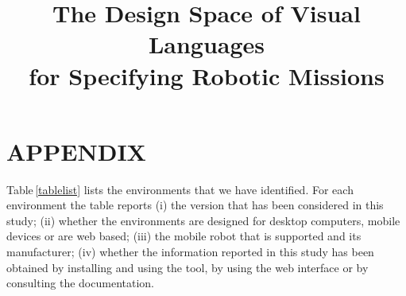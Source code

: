 \documentclass[sigplan,anonymous]{acmart} %
\newcommand\tb[1]{\nb{Thorsten}{#1}}
\newcommand{\tabref}[1]{Table\,\ref{#1}}
\begin{document}
\title{The Design Space of Visual Languages\\for Specifying Robotic Missions}

\renewcommand{\shorttitle}{Design Space of Visual Languages for Specifying Robotic Missions}

\maketitle

















\section*{APPENDIX}

\tabref{tablelist} lists the environments that we have identified.
For each environment the table reports  
(i) the version that has been considered in this study;
(ii) whether the environments are designed for desktop computers,
mobile devices or are web based;
(iii) the mobile robot that is supported and its manufacturer;
(iv) whether the information reported in this study has been obtained by installing and using the tool, by using the web interface or by consulting the documentation.








\end{document}
